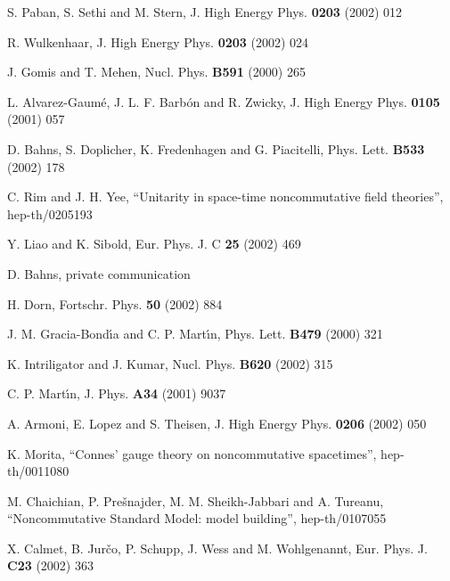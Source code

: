 \documentclass[a4paper,12pt]{article}
\newcommand{\1}{\mathbf{1}}         %
\newcommand{\7}{\dagger}            %
\newcommand{\8}{\bullet}            %
\renewcommand{\.}{\cdot}            %
\renewcommand{\:}{\colon}           %
\begin{document}
\begin{thebibliography}{92}
S. Paban, S. Sethi and M. Stern,
J. High Energy Phys. {\bf 0203} (2002) 012

R. Wulkenhaar,
J. High Energy Phys. {\bf 0203} (2002) 024

J. Gomis and T. Mehen,
Nucl. Phys. {\bf B591} (2000) 265

L. Alvarez-Gaum\'e, J. L. F. Barb\'on and R. Zwicky,
J. High Energy Phys. {\bf 0105} (2001) 057

D. Bahns, S. Doplicher, K. Fredenhagen and G. Piacitelli,
Phys. Lett. {\bf B533} (2002) 178

C. Rim and J. H. Yee, 
``Unitarity in space-time noncommutative field theories'', 
hep-th/0205193

Y. Liao and K. Sibold,
Eur. Phys. J. C {\bf 25} (2002) 469

D. Bahns, private communication

H. Dorn,
Fortschr. Phys. {\bf 50} (2002) 884

J. M. Gracia-Bond\'{\i}a and C. P. Mart\'{\i}n,
Phys. Lett. {\bf B479} (2000) 321

K. Intriligator and J. Kumar,
Nucl. Phys. {\bf B620} (2002) 315

C. P. Mart\'{\i}n,
J. Phys. {\bf A34} (2001) 9037

A. Armoni, E. Lopez and S. Theisen,
J. High Energy Phys. {\bf 0206} (2002) 050

K. Morita,
``Connes' gauge theory on noncommutative spacetimes'',
hep-th/0011080

M. Chaichian, P. Pre\v{s}najder, M. M. Sheikh-Jabbari and A. Tureanu,
``Noncommutative Standard Model: model building'',
hep-th/0107055

X. Calmet, B. Jur\v{c}o, P. Schupp, J. Wess and M. Wohlgenannt,
Eur. Phys. J. {\bf C23} (2002) 363


\end{thebibliography}
\end{document}
